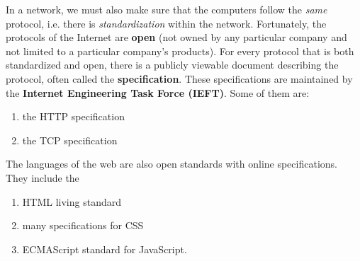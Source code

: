 \documentclass{article}
\begin{document}
  In a network, we must also make sure that the computers follow the \textit{same} protocol, i.e. there is \textit{standardization} within the network. Fortunately, the protocols of the Internet are \textbf{open} (not owned by any particular company and not limited to a particular company's products). For every protocol that is both standardized and open, there is a publicly viewable document describing the protocol, often called the \textbf{specification}. These specifications are maintained by the \textbf{Internet Engineering Task Force (IEFT)}. Some of them are: 
  \begin{enumerate}
      \item the HTTP specification
      \item the TCP specification
  \end{enumerate}
  The languages of the web are also open standards with online specifications. They include the
  \begin{enumerate}
      \item HTML living standard
      \item many specifications for CSS
      \item ECMAScript standard for JavaScript. 
  \end{enumerate}
\end{document}
